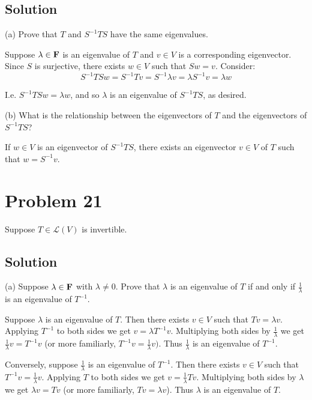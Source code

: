 \documentclass{article}
\begin{document}
\subsection*{Solution}
(a) Prove that $T$ and $S^{-1}TS$ have the same eigenvalues.

Suppose $\lambda\in\mathbf{F}$ is an eigenvalue of $T$ and $v\in V$ is a corresponding eigenvector. Since $S$ is surjective, there exists $w\in V$ such that $Sw=v$. Consider:
\[S^{-1}TSw=S^{-1}Tv=S^{-1}\lambda v=\lambda S^{-1}v=\lambda w\]

I.e. $S^{-1}TSw=\lambda w$, and so $\lambda$ is an eigenvalue of $S^{-1}TS$, as desired.

\vs

(b) What is the relationship between the eigenvectors of $T$ and the eigenvectors of $S^{-1}TS$?

\vs

If $w\in V$ is an eigenvector of $S^{-1}TS$, there exists an eigenvector $v\in V$ of $T$ such that $w=S^{-1}v$.

\section*{Problem 21}
Suppose $T\in\mathcal{L}(V)$ is invertible.

\subsection*{Solution}
(a) Suppose $\lambda\in\mathbf{F}$ with $\lambda\neq0$. Prove that $\lambda$ is an eigenvalue of $T$ if and only if $\frac{1}{\lambda}$ is an eigenvalue of $T^{-1}$.

\vs

Suppose $\lambda$ is an eigenvalue of $T$. Then there exists $v\in V$ such that $Tv=\lambda v$. Applying $T^{-1}$ to both sides we get $v=\lambda T^{-1} v$. Multiplying both sides by $\frac{1}{\lambda}$ we get $\frac{1}{\lambda}v=T^{-1}v$ (or more familiarly, $T^{-1}v=\frac{1}{\lambda}v)$. Thus $\frac{1}{\lambda}$ is an eigenvalue of $T^{-1}$.

\vs

Conversely, suppose $\frac{1}{\lambda}$ is an eigenvalue of $T^{-1}$. Then there exists $v\in V$ such that $T^{-1}v=\frac{1}{\lambda}v$. Applying $T$ to both sides we get $v=\frac{1}{\lambda}Tv$. Multiplying both sides by $\lambda$ we get $\lambda v=Tv$ (or more familiarly, $Tv=\lambda v$). Thus $\lambda$ is an eigenvalue of $T$.

\vs
\end{document}
